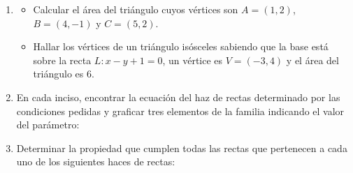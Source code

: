 \documentclass[11pt]{article}
\begin{document}
\begin{enumerate}[\hspace{-7mm}$1)$]
\item 
\begin{itemize}
    \item[(a)] Calcular el área del triángulo cuyos vértices son $A = (1, 2)$, $B = (4, -1)$ y $C = (5, 2)$.
    \item[(b)] Hallar los vértices de un triángulo isósceles sabiendo que la base está sobre la recta $L : x - y + 1 = 0$, un vértice es $V = (-3, 4)$ y el área del triángulo es 6.
\end{itemize}











\item En cada inciso, encontrar la ecuación del haz de rectas determinado por las condiciones pedidas y graficar tres elementos de la familia indicando el valor del parámetro:

\begin{itemize}
\end{itemize}







\item Determinar la propiedad que cumplen todas las rectas que pertenecen a cada uno de los siguientes haces de rectas:

\begin{itemize}
\end{itemize}

\end{enumerate}
\end{document}
